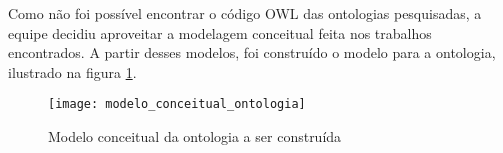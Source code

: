 
  Como não foi possível encontrar o código OWL das ontologias pesquisadas, a equipe decidiu aproveitar a
  modelagem conceitual feita nos trabalhos encontrados. A partir desses modelos, foi construído o modelo 
  para a ontologia, ilustrado na figura \ref{fig:modelo_conceitual_ontologia}.
  
  \begin{figure}[!htb]
    \centering
    \texttt{[image: modelo\_conceitual\_ontologia]}
    \caption[Modelo conceitual da ontologia]{Modelo conceitual da ontologia a ser construída}
    \label{fig:modelo_conceitual_ontologia}
  \end{figure}